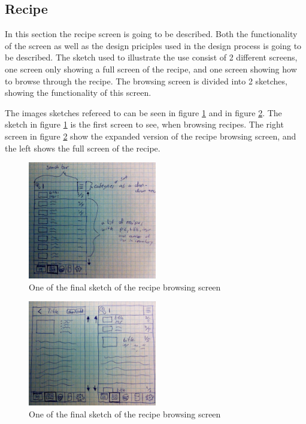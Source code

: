 \subsection{Recipe}

In this section the recipe screen is going to be described. Both the functionality of the screen as well as the design priciples used in the design process is going to be described. The sketch used to illustrate the use consist of 2 different screens, one screen only showing a full screen of the recipe, and one screen showing how to browse through the recipe. The browsing screen is divided into 2 sketches, showing the functionality of this screen.

The images sketches refereed to can be seen in figure \ref{FinalRecipeBrowsingSketch1} and in figure \ref{FinalRecipeBrowsingSketch2}. The sketch in figure \ref{FinalRecipeBrowsingSketch1} is the first screen to see, when browsing recipes. The right screen in figure \ref{FinalRecipeBrowsingSketch2} show the expanded version of the recipe browsing screen, and the left shows the full screen of the recipe.

\begin{figure}[H]
    \centering
    \includegraphics[width=0.5\textwidth]{Grafik/FoodPlanner/FinalRecipeBrowsingSketch1}
    \caption{One of the final sketch of the recipe browsing screen}
    \label{FinalRecipeBrowsingSketch1}
\end{figure}

\begin{figure}[H]
    \centering
    \includegraphics[width=0.5\textwidth]{Grafik/FoodPlanner/FinalRecipeBrowsingSketch2}
    \caption{One of the final sketch of the recipe browsing screen}
    \label{FinalRecipeBrowsingSketch2}
\end{figure}

